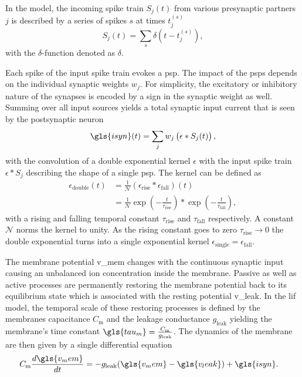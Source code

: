 In the model, the incoming spike train $S_j(t)$ from various presynaptic partners $j$ is described by a series of spikes $s$ at times $t_j^{(s)}$
\begin{equation*}
S_j(t) = \sum_s \delta(t - t_j^{(s)}),
\end{equation*}
with the $\delta$-function denoted as $\delta$. 

Each spike of the input spike train evokes a \gls{psp}. The impact of the \glspl{psp} depends on the individual synaptic weights $w_j$. For simplicity, the excitatory or inhibitory nature of the synapses is encoded by a sign in the synaptic weight as well. Summing over all input sources yields a total synaptic input current that is seen by the postsynaptic neuron
\begin{equation}
\gls{isyn}(t) = \sum_j w_j \left(\epsilon \ast S_j(t)\right),
\label{synaptic_input}
\end{equation}
with the convolution of a double exponential kernel $\epsilon$ with the input spike train $\epsilon \ast S_j$ describing the shape of a single \gls{psp}. The kernel can be defined as
\begin{align*}
\epsilon_\text{double}(t) 	&=\frac{1}{\mathcal{N}} \left(\epsilon_\text{rise} \ast \epsilon_\text{fall}\right)(t) \\
&=\frac{1}{\mathcal{N}}\exp \left(-\frac{t}{\tau_\text{rise}} \right)  \ast \exp \left(-\frac{t}{\tau_\text{fall}} \right), 
\end{align*}
with a rising and falling temporal constant $\tau_\text{rise}$ and $\tau_\text{fall}$ respectively. A constant $\mathcal{N}$ norms the kernel to unity. As the rising constant goes to zero $\tau_\text{rise} \rightarrow 0$ the double exponential turns into a single exponential kernel $\epsilon_\text{single} = \epsilon_\text{fall}$.

The membrane potential \gls{v_mem} changes with the continuous synaptic input causing an unbalanced ion concentration inside the membrane. Passive as well as active processes are permanently restoring the membrane potential back to its equilibrium state which is associated with the resting potential \gls{v_leak}. In the \gls{lif} model, the temporal scale of these restoring processes is defined by the membranes capacitance $C_\text{m}$ and the leakage conductance $g_\text{leak}$ yielding the membrane's time constant $\gls{tau_m} = \frac{C_\text{m}}{g_\text{leak}}$. The dynamics of the membrane are then given by a single differential equation
\begin{align}
\label{lifeq}
C_{\text{m}} \frac{d\gls{v_mem}}{dt} &= -g_{\text{leak}} (\gls{v_mem} - \gls{v_leak}) + \gls{isyn}.
\end{align}

